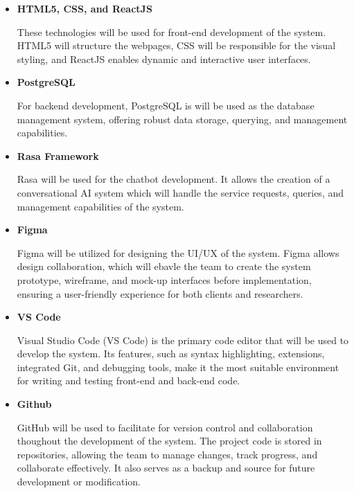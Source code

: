 \begin{itemize}
	\item \textbf{HTML5, CSS, and ReactJS}
	
	These technologies will be used for front-end development of the system. HTML5 will structure the webpages, CSS will be responsible for the visual styling, and ReactJS enables dynamic and interactive user interfaces.\newline
	
	\item \textbf{PostgreSQL}
	
	For backend development, PostgreSQL is will be used as the database management system, offering robust data storage, querying, and management capabilities.\newline
	
	\item \textbf{Rasa Framework}
	
	Rasa will be used for the chatbot development. It allows the creation of a conversational AI system which will handle the service requests, queries, and management capabilities of the system.\newline
	
	\item \textbf{Figma}
	
	Figma will be utilized for designing the UI/UX of the system. Figma allows design collaboration, which will ebavle the team to create the system prototype, wireframe, and mock-up interfaces before implementation, ensuring a user-friendly experience for both clients and researchers.\newline
	
	\item \textbf{VS Code}
	
	Visual Studio Code (VS Code) is the primary code editor that will be used to develop the system. Its features, such as syntax highlighting, extensions, integrated Git, and debugging tools, make it the most suitable environment for writing and testing front-end and back-end code.\newline
	
	\item \textbf{Github}
	
	GitHub will be used to facilitate for version control and collaboration thoughout the development of the system. The project code is stored in repositories, allowing the team to manage changes, track progress, and collaborate effectively. It also serves as a backup and source for future development or modification.
	
\end{itemize}



